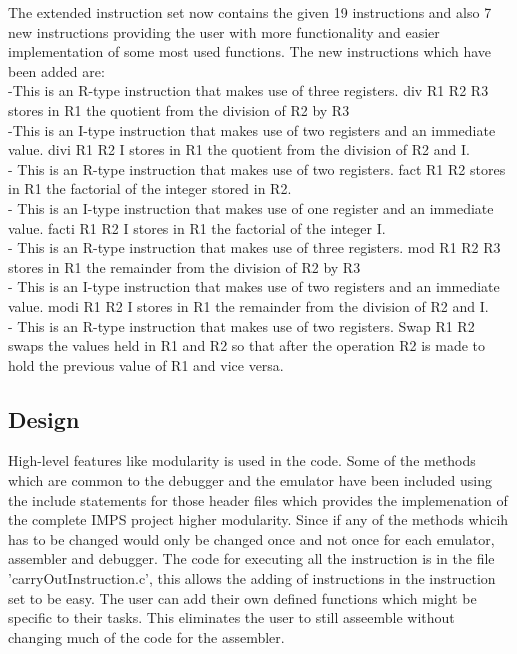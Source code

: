 \documentclass[12pt,a4paper,oneside]{report}
\begin{document}
The extended instruction set now contains the given 19 instructions and also 7 new instructions providing the user with more functionality and easier implementation of some most used functions. The new instructions which have been added are:\\
 -This is an R-type instruction that makes use of three registers.
div R1 R2 R3 stores in R1 the quotient from the division of R2 by R3\\
 -This is an I-type instruction that makes use of two registers and an immediate value. divi R1 R2 I stores in R1 the quotient from the division of R2 and I.\\
- This is an R-type instruction that makes use of two registers.
fact R1 R2 stores in R1 the factorial of the integer stored in R2. \\
- This is an I-type instruction that makes use of one register and an immediate value.
facti R1 R2 I stores in R1 the factorial of the integer I.\\
- This is an R-type instruction that makes use of three registers.
mod R1 R2 R3 stores in R1 the remainder from the division of R2 by R3\\
 - This is an I-type instruction that makes use of two registers and an immediate value.
modi R1 R2 I stores in R1 the remainder from the division of R2 and I.\\
 - This is an R-type instruction that makes use of two registers. Swap R1 R2 swaps the values held in R1 and R2 so that after the operation R2 is made to hold the previous value of R1 and vice versa.\\



\begin{center}
\section*  {Design}
\end{center}


High-level features like modularity is used in the code. Some of the methods which are common to the debugger and the emulator have been included using the include statements for those header files which provides the implemenation of the complete IMPS project higher modularity. Since if any of the methods whicih has to be changed would only be changed once and not once for each emulator, assembler and debugger. The code for executing all the instruction is in the file 'carryOutInstruction.c', this allows the adding of instructions in the instruction set to be easy. The user can add their own defined functions which might be specific to their tasks. This eliminates the user to still asseemble without changing much of the code for the assembler. 
\end{document}
